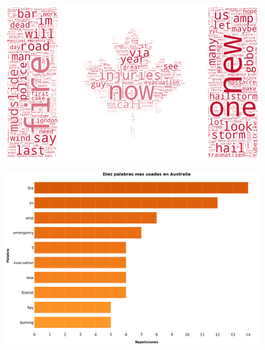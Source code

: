 \documentclass[titlepage,a4paper]{article}
\begin{document}
    
    \begin{figure}[H]
    \centering
    \includegraphics[width=1\textwidth]{graficos/Analisis de Locacion/bandera_canada.png}
    \caption{}    
    \end{figure}
    
    \begin{figure}[H]
    \centering
    \includegraphics[width=1\textwidth]{graficos/Analisis de Locacion/10_palabras_mas_usadas_australia.png}
    \caption{}
    \end{figure}
    
\end{document}
